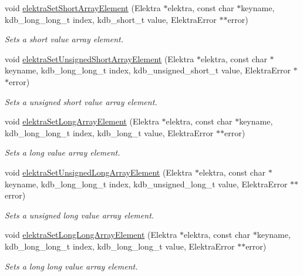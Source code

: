\begin{DoxyCompactItemize}
void \mbox{\hyperlink{group__highlevel_gad2e6abba0f2eb7a1b47c414edd14d06c}{elektra\+Set\+Short\+Array\+Element}} (Elektra $\ast$elektra, const char $\ast$keyname, kdb\+\_\+long\+\_\+long\+\_\+t index, kdb\+\_\+short\+\_\+t value, Elektra\+Error $\ast$$\ast$error)
\begin{DoxyCompactList}\small\item\em Sets a short value array element. \end{DoxyCompactList}\item 
void \mbox{\hyperlink{group__highlevel_ga741c5229d88a8f92efd80f50958ade06}{elektra\+Set\+Unsigned\+Short\+Array\+Element}} (Elektra $\ast$elektra, const char $\ast$keyname, kdb\+\_\+long\+\_\+long\+\_\+t index, kdb\+\_\+unsigned\+\_\+short\+\_\+t value, Elektra\+Error $\ast$$\ast$error)
\begin{DoxyCompactList}\small\item\em Sets a unsigned short value array element. \end{DoxyCompactList}\item 
void \mbox{\hyperlink{group__highlevel_ga085ab1a0bd4a0eda44230accac22cb23}{elektra\+Set\+Long\+Array\+Element}} (Elektra $\ast$elektra, const char $\ast$keyname, kdb\+\_\+long\+\_\+long\+\_\+t index, kdb\+\_\+long\+\_\+t value, Elektra\+Error $\ast$$\ast$error)
\begin{DoxyCompactList}\small\item\em Sets a long value array element. \end{DoxyCompactList}\item 
void \mbox{\hyperlink{group__highlevel_ga074028aab60ec3dad24940c344c9fd05}{elektra\+Set\+Unsigned\+Long\+Array\+Element}} (Elektra $\ast$elektra, const char $\ast$keyname, kdb\+\_\+long\+\_\+long\+\_\+t index, kdb\+\_\+unsigned\+\_\+long\+\_\+t value, Elektra\+Error $\ast$$\ast$error)
\begin{DoxyCompactList}\small\item\em Sets a unsigned long value array element. \end{DoxyCompactList}\item 
void \mbox{\hyperlink{group__highlevel_ga7f017b31c2cada6f5739fda082404f80}{elektra\+Set\+Long\+Long\+Array\+Element}} (Elektra $\ast$elektra, const char $\ast$keyname, kdb\+\_\+long\+\_\+long\+\_\+t index, kdb\+\_\+long\+\_\+long\+\_\+t value, Elektra\+Error $\ast$$\ast$error)
\begin{DoxyCompactList}\small\item\em Sets a long long value array element. \end{DoxyCompactList}\item 
$$
\end{DoxyCompactItemize}
